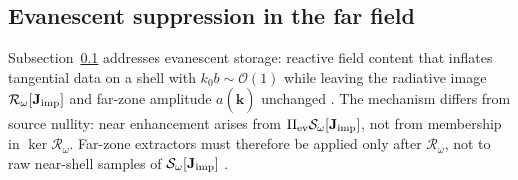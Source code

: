 \subsection{Evanescent suppression in the far field}
\label{sec:ch2103}
Subsection~\ref{sec:ch2103} addresses evanescent storage: reactive field content that inflates
tangential data on a shell with $k_0 b\sim\mathcal{O}(1)$ while leaving the radiative image
$\mathcal{R}_\omega[\mathbf{J}_{\mathrm{imp}}]$ and far-zone amplitude $a(\widehat{\mathbf{k}})$ unchanged
\cite{stratton1941,hansen1988}. The mechanism differs from source nullity: near enhancement arises
from $\Pi_{\mathrm{ev}}\mathcal{S}_\omega[\mathbf{J}_{\mathrm{imp}}]$, not from membership in
$\ker\mathcal{R}_\omega$. Far-zone extractors must therefore be applied only after
$\mathcal{R}_\omega$, not to raw near-shell samples of $\mathcal{S}_\omega[\mathbf{J}_{\mathrm{imp}}]$
\cite{harrington2001}.


